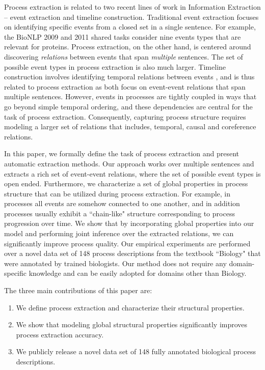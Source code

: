 Process extraction is related to two recent lines of work in Information Extraction -- event extraction and timeline construction.
Traditional event extraction focuses on identifying specific events from a closed set in a single sentence. 
For example, the BioNLP 2009 and 2011 shared tasks \cite{kim09,kim11} consider nine events types that are relevant for proteins.
Process extraction, on the other hand, is centered around discovering \emph{relations} between events that span \emph{multiple} sentences. The set of possible event types in process extraction is also much larger. Timeline construction involves identifying temporal relations between events \cite{Chambers08,Yoshikawa09,Denis11,Do12,Mcclosky12}, and is thus related to process extraction as both focus on event-event relations that span multiple sentences. However, events in processes are tightly coupled in ways that go beyond simple temporal ordering, and these dependencies are central for the task of process extraction. Consequently, capturing process structure requires modeling a larger set of relations that includes, temporal, causal and coreference relations.


In this paper, we formally define the task of process extraction and present automatic extraction methods. 
Our approach works over multiple sentences and extracts a rich set of event-event relations, where the set of possible event types is open ended. 
Furthermore, we characterize a set of global properties in process structure that can be utilized during process extraction. 
For example, in processes all events are somehow connected to one another, and in addition processes usually exhibit a ``chain-like" structure corresponding to process progression over time. 
We show that by incorporating global properties into our model and performing joint inference over the extracted relations, we can significantly improve process quality.  
Our empirical experiments are performed over a novel data set of 148 process descriptions from the textbook ``Biology" \cite{CampbellReece} that were annotated by trained biologists. Our method does not require any domain-specific knowledge and can be easily adopted for domains other than Biology.

The three main contributions of this paper are:
\begin{enumerate}[itemsep=0pt,topsep=0pt] 
\item We define process extraction and characterize their structural properties.
\item We show that modeling global structural properties significantly improves process extraction accuracy.
\item  We publicly release a novel data set of 148 fully annotated biological process descriptions.
\end{enumerate}
